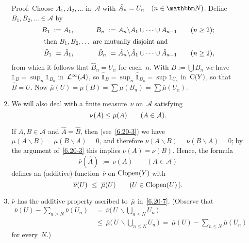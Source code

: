 \documentclass[main.tex]{subfiles}
\begin{document}
\begin{psec}{6.20}
\begin{enumerate}
{\begin{equation*}
\end{equation*}}
Proof:
Choose $A_1,A_2,\dotsc$ in~$\mathcal A$
with $\hat{A}_n=U_n\quad(n\in\N)$.
Define $B_1,B_2,\dotsc\in\mathcal A$ by
\begin{alignat*}{4}
B_1\ :=&\ A_1\htam{, }&\qquad
B_n\ :=&\ A_n\backslash A_1\cup\dotsb\cup A_{n-1}& \quad &(n\geq 2)\htam{;} \\
\shortintertext{
then $B_1,B_2,\dotsc$ are mutually disjoint and}
\hat{B}_1\ =&\ \hat{A}_1\htam{, }&\qquad
\hat{B}_n\ =&\ \hat{A}_n\backslash \hat{A}_1 \cup\dotsb\cup\hat{A}_{n-1}&
  \quad&(n\geq 2)\htam{,}
\end{alignat*}
from which it follows that $\hat{B}_n=U_n$
for each~$n$.
With $B:=\bigcup B_n$
we have $\mathbb{1}_B=\sup_n \mathbb{1}_{B_n}$
in~$\mathcal{L}^\infty(\mathcal A)$,
so $\hat{\mathbb{1}}_B=\sup_n \hat{\mathbb{1}}_{B_n}=\sup \mathbb{1}_{U_n}$
in~$\mathrm{C}(Y)$,
so that $\hat{B}=U$.
Now $\overline\mu(U)=\mu(B)
=\sum\mu(B_n)=\sum\overline\mu(U_n)$.
%
\item\label{6.20-8}
We will also deal with a finite measure~$\nu$ on~$\mathcal A$ satisfying
\begin{equation*}
\nu(A)\leq\mu(A)\qquad(A\in\mathcal A)\text{.}
\end{equation*}

If $A,B\in\mathcal A$
and $\hat A=\hat B$,
then (see~\ref{6.20-3})
we have $\mu(A\backslash B)=\mu(B\backslash A)=0$,
and therefore $\nu(A\backslash B)= \nu(B\backslash A)=0$;
by the argument of~\ref{6.20-3}
this implies $\nu(A)=\nu(B)$.
Hence, the formula
\begin{equation*}
\overline\nu(\hat A)\ :=\ \nu(A)\qquad(A\in\mathcal A)
\end{equation*}
defines an (additive) function~$\overline\nu$ on $\mathrm{Clopen}(Y)$ with
\begin{equation*}
\overline\nu(U)\ \leq\ \overline\mu(U)\qquad(U\in\clopen(U)\,)\htam{.}
\end{equation*}
%
\item\label{6.20-9}
$\overline\nu$ has the additive property ascribed to~$\overline\mu$
in~\ref{6.20-7}.
(Observe that 
\begin{alignat*}{2}
\textstyle\overline\nu(U)-\sum_{n\geq N} \overline\nu(U_n)
\ &=\    \overline\nu\bigl(\,U\,\backslash
          \textstyle\bigcup_{n\leq N}U_n\,\bigr) \\
\ &\leq\ \overline\mu\bigl(\,U\,\backslash
          \textstyle \bigcup_{n\leq N}U_n\,\bigr)
\ =\     \overline\mu(U)-\sum_{n\leq N}\overline\mu(U_n)
\end{alignat*}
for every~$N$.)
\end{enumerate}
\end{psec}
%
%
%
\clearpage
\end{document}
